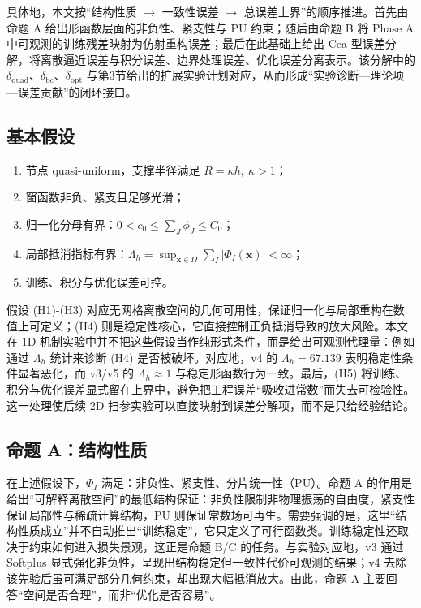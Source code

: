 ﻿\documentclass[lang=cn,a4paper]{elegantpaper}
\begin{document}
具体地，本文按“结构性质 $\rightarrow$ 一致性误差 $\rightarrow$ 总误差上界”的顺序推进。首先由命题 A 给出形函数层面的非负性、紧支性与 PU 约束；随后由命题 B 将 Phase A 中可观测的训练残差映射为仿射重构误差；最后在此基础上给出 Cea 型误差分解，将离散逼近误差与积分误差、边界处理误差、优化误差分离表示。该分解中的 $\delta_{\mathrm{quad}}$、$\delta_{\mathrm{bc}}$、$\delta_{\mathrm{opt}}$ 与第3节给出的扩展实验计划对应，从而形成“实验诊断—理论项—误差贡献”的闭环接口。
\subsection{基本假设}
\begin{enumerate}[label=(H\arabic*)]
  \item 节点 quasi-uniform，支撑半径满足 $R=\kappa h,\ \kappa>1$；
  \item 窗函数非负、紧支且足够光滑；
  \item 归一化分母有界：$0<c_0\le\sum_J\phi_J\le C_0$；
  \item 局部抵消指标有界：$\Lambda_h=\sup_{\bm{x}\in\Omega}\sum_I|\Phi_I(\bm{x})|<\infty$；
  \item 训练、积分与优化误差可控。
\end{enumerate}
假设 (H1)-(H3) 对应无网格离散空间的几何可用性，保证归一化与局部重构在数值上可定义；(H4) 则是稳定性核心，它直接控制正负抵消导致的放大风险。本文在 1D 机制实验中并不把这些假设当作纯形式条件，而是给出可观测代理量：例如通过 $\Lambda_h$ 统计来诊断 (H4) 是否被破坏。对应地，v4 的 $\Lambda_h=67.139$ 表明稳定性条件显著恶化，而 v3/v5 的 $\Lambda_h\approx1$ 与稳定形函数行为一致。最后，(H5) 将训练、积分与优化误差显式留在上界中，避免把工程误差“吸收进常数”而失去可检验性。这一处理使后续 2D 扫参实验可以直接映射到误差分解项，而不是只给经验结论。

\subsection{命题 A：结构性质}
在上述假设下，$\Phi_I$ 满足：非负性、紧支性、分片统一性（PU）。命题 A 的作用是给出“可解释离散空间”的最低结构保证：非负性限制非物理振荡的自由度，紧支性保证局部性与稀疏计算结构，PU 则保证常数场可再生。需要强调的是，这里“结构性质成立”并不自动推出“训练稳定”，它只定义了可行函数类。训练稳定性还取决于约束如何进入损失景观，这正是命题 B/C 的任务。与实验对应地，v3 通过 Softplus 显式强化非负性，呈现出结构稳定但一致性代价可观测的结果；v4 去除该先验后虽可满足部分几何约束，却出现大幅抵消放大。由此，命题 A 主要回答“空间是否合理”，而非“优化是否容易”。
\end{document}
